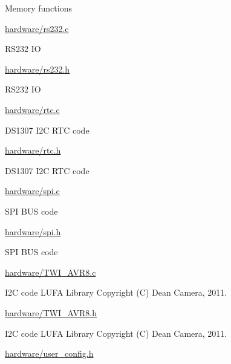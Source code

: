 \begin{DoxyItemize}
\begin{DoxyItemize}
\begin{DoxyItemize}
\item Memory functions
\end{DoxyItemize}
\item \hyperlink{rs232_8c}{hardware/rs232.\+c}
\begin{DoxyItemize}
\item R\+S232 IO
\end{DoxyItemize}
\item \hyperlink{rs232_8h}{hardware/rs232.\+h}
\begin{DoxyItemize}
\item R\+S232 IO
\end{DoxyItemize}
\item \hyperlink{rtc_8c}{hardware/rtc.\+c}
\begin{DoxyItemize}
\item D\+S1307 I2C R\+TC code
\end{DoxyItemize}
\item \hyperlink{rtc_8h}{hardware/rtc.\+h}
\begin{DoxyItemize}
\item D\+S1307 I2C R\+TC code
\end{DoxyItemize}
\item \hyperlink{spi_8c}{hardware/spi.\+c}
\begin{DoxyItemize}
\item S\+PI B\+US code
\end{DoxyItemize}
\item \hyperlink{spi_8h}{hardware/spi.\+h}
\begin{DoxyItemize}
\item S\+PI B\+US code
\end{DoxyItemize}
\item \hyperlink{TWI__AVR8_8c}{hardware/\+T\+W\+I\+\_\+\+A\+V\+R8.\+c}
\begin{DoxyItemize}
\item I2C code L\+U\+FA Library Copyright (C) Dean Camera, 2011.
\end{DoxyItemize}
\item \hyperlink{TWI__AVR8_8h}{hardware/\+T\+W\+I\+\_\+\+A\+V\+R8.\+h}
\begin{DoxyItemize}
\item I2C code L\+U\+FA Library Copyright (C) Dean Camera, 2011.
\end{DoxyItemize}
\item \hyperlink{user__config_8h}{hardware/user\+\_\+config.\+h}
\begin{DoxyItemize}

\end{DoxyItemize}
\end{DoxyItemize}
\end{DoxyItemize}
